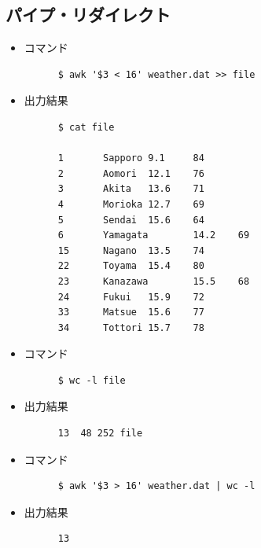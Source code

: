 \documentclass[paper=a4, fontsize=10pt]{jlreq}
\begin{document}
\subsection{パイプ・リダイレクト}
\begin{itemize}
  \item コマンド
    \begin{lstlisting}
      $ awk '$3 < 16' weather.dat >> file
    \end{lstlisting}

  \item 出力結果
    \begin{lstlisting}
      $ cat file

      1       Sapporo 9.1     84
      2       Aomori  12.1    76
      3       Akita   13.6    71
      4       Morioka 12.7    69
      5       Sendai  15.6    64
      6       Yamagata        14.2    69
      15      Nagano  13.5    74
      22      Toyama  15.4    80
      23      Kanazawa        15.5    68
      24      Fukui   15.9    72
      33      Matsue  15.6    77
      34      Tottori 15.7    78
    \end{lstlisting}

  \item コマンド
    \begin{lstlisting}
      $ wc -l file
    \end{lstlisting}

  \item 出力結果
    \begin{lstlisting}
      13  48 252 file
    \end{lstlisting}

  \item コマンド
    \begin{lstlisting}
      $ awk '$3 > 16' weather.dat | wc -l
    \end{lstlisting}

  \item 出力結果
    \begin{lstlisting}
      13
    \end{lstlisting}
\end{itemize}
\end{document}
